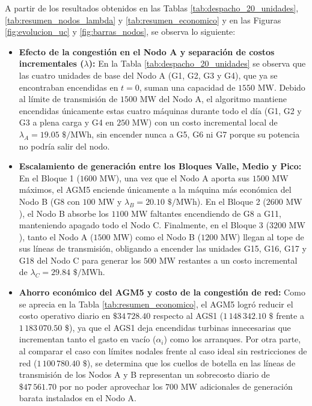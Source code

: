 \documentclass[11pt,letterpaper]{article}
\begin{document}
A partir de los resultados obtenidos en las Tablas \ref{tab:despacho_20_unidades}, \ref{tab:resumen_nodos_lambda} y \ref{tab:resumen_economico} y en las Figuras \ref{fig:evolucion_uc} y \ref{fig:barras_nodos}, se observa lo siguiente:
\begin{itemize}
    \item \textbf{Efecto de la congestión en el Nodo A y separación de costos incrementales ($\lambda$):} En la Tabla \ref{tab:despacho_20_unidades} se observa que las cuatro unidades de base del Nodo A (G1, G2, G3 y G4), que ya se encontraban encendidas en $t=0$, suman una capacidad de $1550\text{ MW}$. Debido al límite de transmisión de $1500\text{ MW}$ del Nodo A, el algoritmo mantiene encendidas únicamente estas cuatro máquinas durante todo el día (G1, G2 y G3 a plena carga y G4 en $250\text{ MW}$) con un costo incremental local de $\lambda_A = 19.05\text{ \$/MWh}$, sin encender nunca a G5, G6 ni G7 porque su potencia no podría salir del nodo.
    \item \textbf{Escalamiento de generación entre los Bloques Valle, Medio y Pico:} En el Bloque 1 ($1600\text{ MW}$), una vez que el Nodo A aporta sus $1500\text{ MW}$ máximos, el AGM5 enciende únicamente a la máquina más económica del Nodo B (G8 con $100\text{ MW}$ y $\lambda_B = 20.10\text{ \$/MWh}$). En el Bloque 2 ($2600\text{ MW}$), el Nodo B absorbe los $1100\text{ MW}$ faltantes encendiendo de G8 a G11, manteniendo apagado todo el Nodo C. Finalmente, en el Bloque 3 ($3200\text{ MW}$), tanto el Nodo A ($1500\text{ MW}$) como el Nodo B ($1200\text{ MW}$) llegan al tope de sus líneas de transmisión, obligando a encender las unidades G15, G16, G17 y G18 del Nodo C para generar los $500\text{ MW}$ restantes a un costo incremental de $\lambda_C = 29.84\text{ \$/MWh}$.
    \item \textbf{Ahorro económico del AGM5 y costo de la congestión de red:} Como se aprecia en la Tabla \ref{tab:resumen_economico}, el AGM5 logró reducir el costo operativo diario en $\$34\,728.40$ respecto al AGS1 ($1\,148\,342.10\text{ \$}$ frente a $1\,183\,070.50\text{ \$}$), ya que el AGS1 deja encendidas turbinas innecesarias que incrementan tanto el gasto en vacío ($\alpha_i$) como los arranques. Por otra parte, al comparar el caso con límites nodales frente al caso ideal sin restricciones de red ($1\,100\,780.40\text{ \$}$), se determina que los cuellos de botella en las líneas de transmisión de los Nodos A y B representan un sobrecosto diario de $\$47\,561.70$ por no poder aprovechar los $700\text{ MW}$ adicionales de generación barata instalados en el Nodo A.
\end{itemize}
\end{document}

